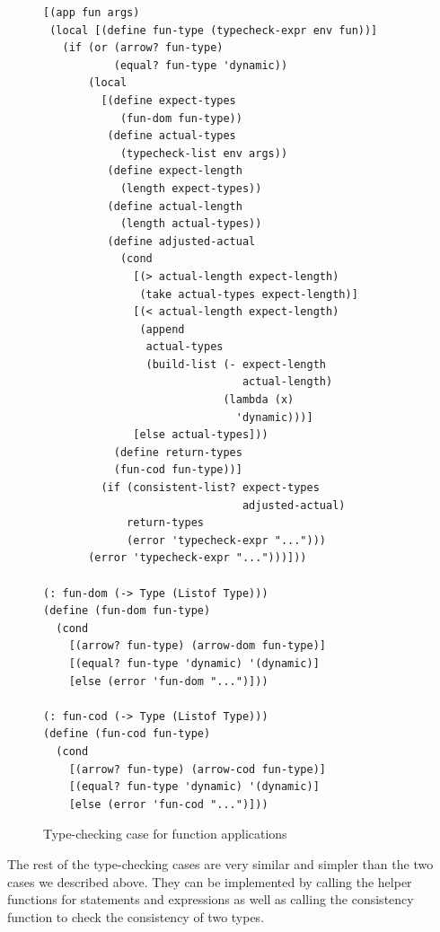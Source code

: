 \begin{figure}[h]
    \begin{lstlisting}[language=racket]
[(app fun args)
 (local [(define fun-type (typecheck-expr env fun))]
   (if (or (arrow? fun-type)
           (equal? fun-type 'dynamic))
       (local
         [(define expect-types
            (fun-dom fun-type))
          (define actual-types
            (typecheck-list env args))
          (define expect-length
            (length expect-types))
          (define actual-length
            (length actual-types))
          (define adjusted-actual
            (cond
              [(> actual-length expect-length)
               (take actual-types expect-length)]
              [(< actual-length expect-length)
               (append
                actual-types
                (build-list (- expect-length
                               actual-length)
                            (lambda (x)
                              'dynamic)))]
              [else actual-types]))
           (define return-types
           (fun-cod fun-type))]
         (if (consistent-list? expect-types
                               adjusted-actual)
             return-types
             (error 'typecheck-expr "...")))
       (error 'typecheck-expr "...")))]))

(: fun-dom (-> Type (Listof Type)))
(define (fun-dom fun-type)
  (cond
    [(arrow? fun-type) (arrow-dom fun-type)]
    [(equal? fun-type 'dynamic) '(dynamic)]
    [else (error 'fun-dom "...")]))

(: fun-cod (-> Type (Listof Type)))
(define (fun-cod fun-type)
  (cond
    [(arrow? fun-type) (arrow-cod fun-type)]
    [(equal? fun-type 'dynamic) '(dynamic)]
    [else (error 'fun-cod "...")]))
    \end{lstlisting}
    \caption[]{Type-checking case for function applications}
    \label{fig:app}
\end{figure}

The rest of the type-checking cases are very similar and simpler than the two cases we described above. They can be implemented by calling the helper functions for statements and expressions as well as calling the consistency function to check the consistency of two types.

